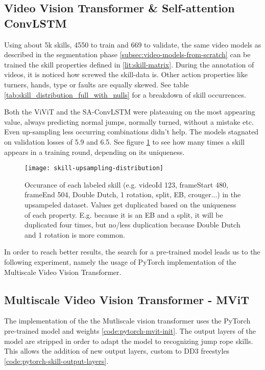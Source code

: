 \subsection{Video Vision Transformer \& Self-attention ConvLSTM}

Using about 5k skills, 4550 to train and 669 to validate, the same video models as described in the segmentation phase \ref{subsec:video-models-from-scratch} can be trained the skill properties defined in \ref{lit:skill-matrix}.
During the annotation of videos, it is noticed how screwed the skill-data is. Other action properties like turners, hands, type or faults are equally skewed. See table \ref{tab:skill_distribution_full_with_nulls} for a breakdown of skill occurrences.

Both the ViViT and the SA-ConvLSTM were plateauing on the most appearing value, always predicting normal jumps, normally turned, without a mistake etc.
Even up-sampling less occurring combinations didn't help. The models stagnated on validation losses of 5.9 and 6.5. See figure \ref{fig:skill-upsampling-distribution} to see how many times a skill appears in a training round, depending on its uniqueness.

\begin{figure}
    \centering
    \texttt{[image: skill-upsampling-distribution]}
    \caption[upsampling distribution of skills]{Occurance of each labeled skill (e.g. videoId 123, frameStart 480, frameEnd 504, Double Dutch, 1 rotation, split, EB, crouger...) in the upsampeled dataset. Values get duplicated based on the uniqueness of each property. E.g. because it is an EB and a split, it will be duplicated four times, but no/less duplication because Double Dutch and 1 rotation is more common.}
    \label{fig:skill-upsampling-distribution}
\end{figure}

In order to reach better results, the search for a pre-trained model leads us to the following experiment, namely the usage of PyTorch implementation of the Multiscale Video Vision Transformer.

\subsection{Multiscale Video Vision Transformer - MViT}
\label{results:mvit}

The implementation of the the Mutliscale vision transformer uses the PyTorch pre-trained model and weights \ref{code:pytorch-mvit-init}.
The output layers of the model are stripped in order to adapt the model to recognizing jump rope skills. This allows the addition of new output layers, custom to DD3 freestyles \ref{code:pytorch-skill-output-layers}.

